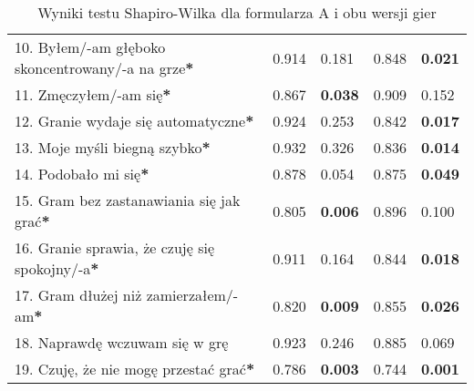 \begin{table}[h!]
\begin{center}
\begin{tabular}{|m{10em}|m{5em}|m{5em}|m{5em}|m{5em}|}
            10. Byłem/-am głęboko \newline skoncentrowany/-a \newline na grze\textbf{*} & 0.914                       & 0.181            & 0.848                   & \textbf{0.021} \\
            11. Zmęczyłem/-am się\textbf{*}                                             & 0.867                       & \textbf{0.038}   & 0.909                   & 0.152          \\
            12. Granie wydaje się automatyczne\textbf{*}                                & 0.924                       & 0.253            & 0.842                   & \textbf{0.017} \\
            13. Moje myśli \newline biegną szybko\textbf{*}                             & 0.932                       & 0.326            & 0.836                   & \textbf{0.014} \\
            14. Podobało mi się\textbf{*}                                               & 0.878                       & 0.054            & 0.875                   & \textbf{0.049} \\
            15. Gram bez zastanawiania się jak grać\textbf{*}                           & 0.805                       & \textbf{0.006}   & 0.896                   & 0.100          \\
            16. Granie sprawia, \newline że czuję się spokojny/-a\textbf{*}             & 0.911                       & 0.164            & 0.844                   & \textbf{0.018} \\
            17. Gram dłużej \newline niż zamierzałem/-am\textbf{*}                      & 0.820                       & \textbf{0.009}   & 0.855                   & \textbf{0.026} \\
            18. Naprawdę wczuwam się w grę                                              & 0.923                       & 0.246            & 0.885                   & 0.069          \\
            19. Czuję, że nie mogę przestać grać\textbf{*}                              & 0.786                       & \textbf{0.003}   & 0.744                   & \textbf{0.001} \\
            \hline
        \end{tabular}
    \end{center}
    \caption{Wyniki testu Shapiro-Wilka dla formularza A i obu wersji gier}\label{tab1:ch7_10}
\end{table}

